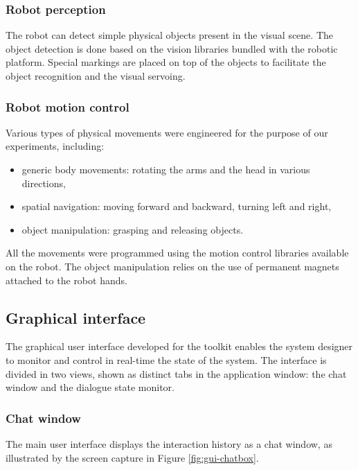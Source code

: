 \subsubsection*{Robot perception}

The robot can detect simple physical objects present in the visual scene. The object detection is done based on the vision libraries bundled with the robotic platform. Special  markings are placed on top of the objects to facilitate the object recognition and the visual servoing.  

\subsubsection*{Robot motion control}

Various types of physical movements were engineered for the purpose of our experiments, including: \begin{itemize}
\item generic body movements: rotating the arms and the head in various directions,
\item spatial navigation: moving forward and backward, turning left and right,
\item object manipulation: grasping and releasing objects.  
\end{itemize}

All the movements were programmed using the motion control libraries available on the robot. The object manipulation relies on the use of permanent magnets attached to the robot hands. 


\subsection{Graphical interface}

The graphical user interface developed for the \opendial{} toolkit enables the system designer to monitor and control in real-time the state of the system.  The interface is divided in two  views, shown as distinct tabs in the application window: the chat window and the dialogue state monitor.

\subsubsection*{Chat window}

The main user interface displays the interaction history as a chat window, as illustrated by the screen capture in Figure \ref{fig:gui-chatbox}.


